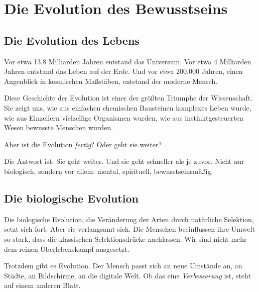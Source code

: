
\chapter{Die Evolution des Bewusstseins}

\section{Die Evolution des Lebens}

Vor etwa 13,8 Milliarden Jahren entstand das Universum. Vor etwa 4 Milliarden Jahren entstand das Leben auf der Erde. Und vor etwa 200.000 Jahren, einen Augenblick in kosmischen Maßstäben, entstand der moderne Mensch.

Diese Geschichte der Evolution ist einer der größten Triumphe der Wissenschaft. Sie zeigt uns, wie aus einfachen chemischen Bausteinen komplexes Leben wurde, wie aus Einzellern vielzellige Organismen wurden, wie aus instinktgesteuerten Wesen bewusste Menschen wurden.

Aber ist die Evolution \emph{fertig}? Oder geht sie weiter?

Die Antwort ist: Sie geht weiter. Und sie geht schneller als je zuvor. Nicht nur biologisch, sondern vor allem: mental, spirituell, bewusstseinsmäßig.

\section{Die biologische Evolution}

Die biologische Evolution, die Veränderung der Arten durch natürliche Selektion, setzt sich fort. Aber sie verlangsamt sich. Die Menschen beeinflussen ihre Umwelt so stark, dass die klassischen Selektionsdrücke nachlassen. Wir sind nicht mehr dem reinen Überlebenskampf ausgesetzt.

Trotzdem gibt es Evolution. Der Mensch passt sich an neue Umstände an, an Städte, an Bildschirme, an die digitale Welt. Ob das eine \emph{Verbesserung} ist, steht auf einem anderen Blatt.

